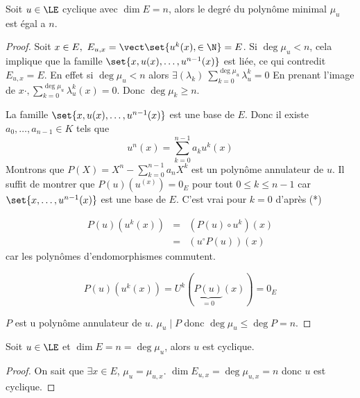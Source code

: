 \begin{prop}
	Soit $u \in \LE$ cyclique avec $\dim E = n$, alors le degré du polynôme minimal $\mu_u$ est égal a $n$.
\end{prop}


\begin{proof}
	Soit $x \in E, \ E_{u,x} = \vect \set {u^k(x),  \in \N} = E$.
	Si $\deg \mu_u < n$, cela implique que la famille $\set {x, u(x), \dots, u^{n-1}(x)}$ est liée, ce qui
	contredit $E_{u,x} = E$. En effet si $\deg  \mu_u < n$ alors $\exists (\lambda_k) \ \sum_{k=0}^{\deg \mu_u} \lambda_ u^k = 0$
	En prenant l'image de $x·, \sum_{k=0}^{\deg \mu_u} \lambda_ u^k(x) =0$. Donc $\deg \mu_k \geq n$.

	La famille $\set {x, u(x), \dots , u^{n-1}(x)}$ est une base de $E$. Donc il existe $a_0, \dots, a_{n-1} \in K$ tels que
	$$ u^n(x) = \sum_{k=0}^{n-1} a_k u^k(x) $$
	Montrons que $P(X) = X^n - \sum_{k=0}^{n-1}a_n X^k$ est un polynôme annulateur de $u$. Il suffit de montrer que $P(u)(u^(x)) = 0_E$
	pour tout $0 \leq k \leq n-1$ car $\set {x, \dots, u^{n-1}(x)}$ est une base de $E$. C'est vrai pour $k=0$ d'après (*) %

	\begin{eqnarray*}
		P(u)(u^k(x)) &=& (P(u) \circ u^k) (x)\\
		&=& (u^ \circ P(u)) (x)
	\end{eqnarray*}
	car les polynômes d'endomorphismes commutent.

	$$ P(u) (u^k(x)) = U^k(\underbrace{P(u)}_{=0} (x)) = 0_E$$

	$P$ est u polynôme annulateur de $u$.
	$\mu_u \mid P$ donc $\deg \mu_u \leq \deg P = n$.
\end{proof}


\begin{prop}
	Soit $u \in \LE$ et $\dim E = n = \deg \mu_u$, alors $u$ est cyclique.
\end{prop}

\begin{proof}
	On sait que $\exists x \in E$, $\mu_u = \mu_{u,x}$.
	$\dim E_{u,x} = \deg \mu_{u,x} = n$
	donc $u$ est cyclique.
\end{proof}
